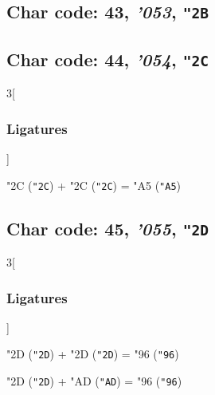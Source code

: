 \documentclass{article}
\newlength{\maxcharwidth}
\begin{document}
\subsection{Char code: 43, {\it'053}, {\tt"2B}}
\label{char_43}


\subsection{Char code: 44, {\it'054}, {\tt"2C}}
\label{char_44}


\begin{multicols}{3}[\subsubsection{Ligatures}]

{\testfont\char"2C\noboundary} ({\tt"2C}) + {\testfont\char"2C\noboundary} ({\tt"2C}) = {\testfont\char"A5\noboundary} ({\tt"A5}) 

\end{multicols}

\subsection{Char code: 45, {\it'055}, {\tt"2D}}
\label{char_45}


\begin{multicols}{3}[\subsubsection{Ligatures}]

{\testfont\char"2D\noboundary} ({\tt"2D}) + {\testfont\char"2D\noboundary} ({\tt"2D}) = {\testfont\char"96\noboundary} ({\tt"96}) 

{\testfont\char"2D\noboundary} ({\tt"2D}) + {\testfont\char"AD\noboundary} ({\tt"AD}) = {\testfont\char"96\noboundary} ({\tt"96}) 

\end{multicols}
\end{document}
